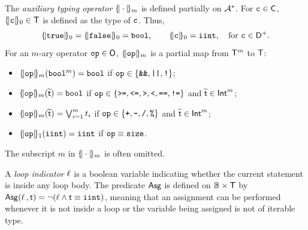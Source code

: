\documentclass[runningheads]{llncs}
\begin{document}
The \textit{auxiliary typing operator} $\{\!|\cdot|\!\}_{m}$ is defined partially on $\mathcal{A}^{*}$. For $\mathtt{c}\in\mathsf{C}$, $\{\!|\mathtt{c}|\!\}_{0}\in\mathsf{T}$ is defined as the type of $\mathtt{c}$. Thus,
\begin{equation}
    \{\!|\texttt{true}|\!\}_{0}=\{\!|\texttt{false}|\!\}_{0}=\mathtt{bool},\qquad \{\!|\texttt{c}|\!\}_{0}=\mathtt{iint},\quad\text{for }\mathtt{c}\in\mathsf{D}^{+}.
\end{equation}
For an $m$-ary operator $\mathtt{op}\in\mathsf{O}$, $\{\!|\mathtt{op}|\!\}_{m}$ is a partial map from $\mathsf{T}^{m}$ to $\mathsf{T}$: %
\begin{itemize}
    \item $\{\!|\mathtt{op}|\!\}_{m}(\mathtt{bool}^{m})=\mathtt{bool}$ if $\mathtt{op}\in\{\texttt{\&\&},\texttt{||},\texttt{!}\}$;
    \item $\{\!|\mathtt{op}|\!\}_{m}(\widetilde{\mathsf{t}})=\mathtt{bool}$ if $\mathtt{op}\in\{\texttt{>=},\texttt{<=},\texttt{>},\texttt{<},\texttt{==},\texttt{!=}\}$ and $\widetilde{\mathsf{t}}\in\mathsf{Int}^m$;
    \item $\{\!|\mathtt{op}|\!\}_{m}(\widetilde{\mathsf{t}})=\bigvee_{i=1}^{m}t_i$ if $\mathtt{op}\in\{\texttt{+},\texttt{-},\texttt{/},\texttt{\%}\}$ and $\widetilde{\mathsf{t}}\in\mathsf{Int}^m$;
    \item $\{\!|\mathtt{op}|\!\}_{1}(\mathtt{iint})=\mathtt{iint}$ if $\mathtt{op}\equiv\mathtt{size}$.
\end{itemize}
The subscript $m$ in $\{\!|\cdot|\!\}_{m}$ is often omitted.

A \textit{loop indicator} $\ell$ is a boolean variable indicating whether the current statement is inside any loop body.
The predicate $\mathsf{Asg}$ is defined on $\mathbb{B}\times\mathsf{T}$ by $\mathsf{Asg}(\ell\,, \mathsf{t})=\lnot (\ell\land \mathsf{t}\equiv\mathtt{iint})$, meaning that an assignment can be performed whenever it is not inside a loop or the variable being assigned is not of iterable type.
\end{document}
